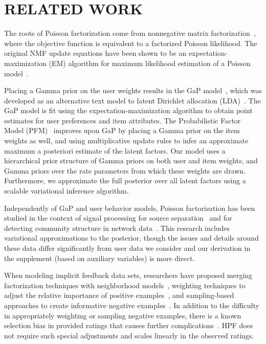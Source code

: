 \section{RELATED WORK}
\label{sec:related}
The roots of Poisson factorization come from nonnegative matrix
factorization~\cite{Lee:1999}, where the objective function is
equivalent to a factorized Poisson likelihood.  The original NMF
update equations have been shown to be an expectation-maximization
(EM) algorithm for maximum likelihood estimation of a Poisson
model~\cite{Cemgil:2009}.

Placing a Gamma prior on the user weights results in the GaP
model~\cite{Canny:2004}, which was developed as an alternative text
model to latent Dirichlet allocation
(LDA)~\cite{Blei:2003b,Inouye:2014}. The GaP model is fit using the
expectation-maximization algorithm to obtain point estimates for user
preferences and item attributes. The Probabilistic Factor Model
(PFM)~\cite{Ma:2011} improves upon GaP by placing a Gamma prior on the
item weights as well, and using multiplicative update rules to infer
an approximate maximum a posteriori estimate of the latent factors.
Our model uses a hierarchical prior
structure of Gamma priors on both user and item weights, and Gamma
priors over the rate parameters from which these weights are
drawn. Furthermore, we approximate the full posterior over all
latent factors using a scalable variational inference algorithm.

Independently of GaP and user behavior models, Poisson factorization
has been studied in the context of signal processing for source
separation~\cite{Cemgil:2009,Hoffman:2012} and for
detecting community structure in network
data~\cite{Ball:2011,Gopalan:2013}. This research includes variational
approximations to the posterior, though the issues and details around
these data differ significantly from user data we consider and our
derivation in the supplement (based on auxiliary variables) is more direct.

When modeling implicit feedback data sets, researchers have proposed
merging factorization techniques with neighborhood
models~\cite{Koren:2008}, weighting techniques to adjust the relative
importance of positive examples~\cite{Hu:2008p9402}, and
sampling-based approaches to create informative negative
examples~\cite{Gantner:2012p9364,Dror:2012a,Paquet:2013p9197}.  In
addition to the difficulty in appropriately weighting or sampling
negative examples, there is a known selection bias in provided ratings
that causes further complications~\cite{Marlin:2012}.  HPF
does not require such special adjustments and scales linearly in the
observed ratings.

